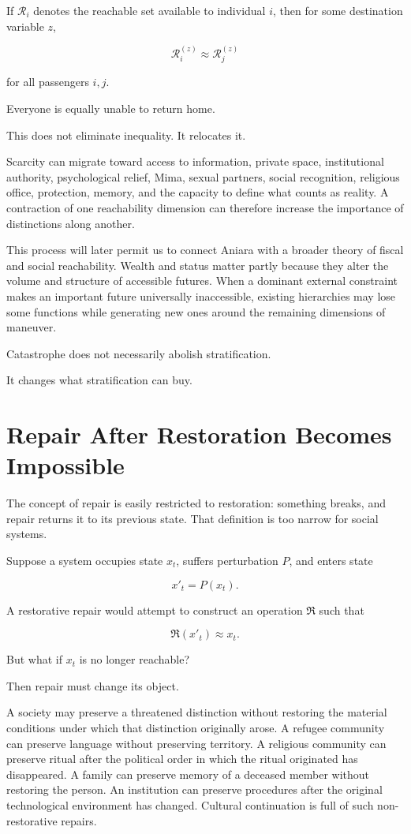 \documentclass[11pt,oneside]{book}
\theoremstyle{definition}
\theoremstyle{remark}
\newcommand{\R}{\mathcal{R}}
\newcommand{\Repair}{\mathfrak{R}}
\begin{document}
If \(\R_i\) denotes the reachable set available to individual \(i\), then for some destination variable \(z\),

\[
\R_i^{(z)}
\approx
\R_j^{(z)}
\]

for all passengers \(i,j\).

Everyone is equally unable to return home.

This does not eliminate inequality. It relocates it.

Scarcity can migrate toward access to information, private space, institutional authority, psychological relief, Mima, sexual partners, social recognition, religious office, protection, memory, and the capacity to define what counts as reality. A contraction of one reachability dimension can therefore increase the importance of distinctions along another.

This process will later permit us to connect Aniara with a broader theory of fiscal and social reachability. Wealth and status matter partly because they alter the volume and structure of accessible futures. When a dominant external constraint makes an important future universally inaccessible, existing hierarchies may lose some functions while generating new ones around the remaining dimensions of maneuver.

Catastrophe does not necessarily abolish stratification.

It changes what stratification can buy.

\section{Repair After Restoration Becomes Impossible}

The concept of repair is easily restricted to restoration: something breaks, and repair returns it to its previous state. That definition is too narrow for social systems.

Suppose a system occupies state \(x_t\), suffers perturbation \(P\), and enters state

\[
x'_t=P(x_t).
\]

A restorative repair would attempt to construct an operation \(\Repair\) such that

\[
\Repair(x'_t)\approx x_t.
\]

But what if \(x_t\) is no longer reachable?

Then repair must change its object.

A society may preserve a threatened distinction without restoring the material conditions under which that distinction originally arose. A refugee community can preserve language without preserving territory. A religious community can preserve ritual after the political order in which the ritual originated has disappeared. A family can preserve memory of a deceased member without restoring the person. An institution can preserve procedures after the original technological environment has changed. Cultural continuation is full of such non-restorative repairs.
\end{document}
